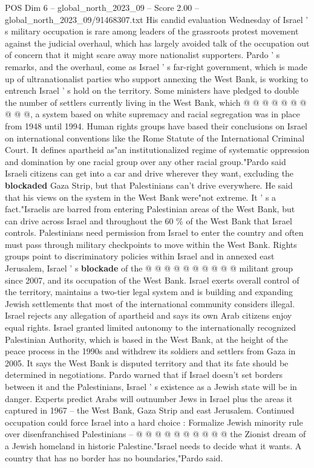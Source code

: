 \begin{textsample}{POS Dim 6 – global\_north\_2023\_09 – Score 2.00 – global\_north\_2023\_09/91468307.txt}
His candid evaluation Wednesday of Israel ' s military occupation is rare among leaders of the grassroots protest movement against the judicial overhaul, which has largely avoided talk of the occupation out of concern that it might scare away more nationalist supporters.
Pardo ' s remarks, and the overhaul, come as Israel ' s far-right government, which is made up of ultranationalist parties who support annexing the West Bank, is working to entrench Israel ' s hold on the territory.
Some ministers have pledged to double the number of settlers currently living in the West Bank, which @ @ @ @ @ @ @ @ @ @, a system based on white supremacy and racial segregation was in place from 1948 until 1994.
Human rights groups have based their conclusions on Israel on international conventions like the Rome Statute of the International Criminal Court.
It defines apartheid as"an institutionalized regime of systematic oppression and domination by one racial group over any other racial group."Pardo said Israeli citizens can get into a car and drive wherever they want, excluding the \textbf{blockaded} Gaza Strip, but that Palestinians can't drive everywhere.
He said that his views on the system in the West Bank were"not extreme.
It ' s a fact."Israelis are barred from entering Palestinian areas of the West Bank, but can drive across Israel and throughout the 60 \% of the West Bank that Israel controls.
Palestinians need permission from Israel to enter the country and often must pass through military checkpoints to move within the West Bank.
Rights groups point to discriminatory policies within Israel and in annexed east Jerusalem, Israel ' s \textbf{blockade} of the @ @ @ @ @ @ @ @ @ @ militant group since 2007, and its occupation of the West Bank.
Israel exerts overall control of the territory, maintains a two-tier legal system and is building and expanding Jewish settlements that most of the international community considers illegal.
Israel rejects any allegation of apartheid and says its own Arab citizens enjoy equal rights.
Israel granted limited autonomy to the internationally recognized Palestinian Authority, which is based in the West Bank, at the height of the peace process in the 1990s and withdrew its soldiers and settlers from Gaza in 2005.
It says the West Bank is disputed territory and that its fate should be determined in negotiations.
Pardo warned that if Israel doesn't set borders between it and the Palestinians, Israel ' s existence as a Jewish state will be in danger.
Experts predict Arabs will outnumber Jews in Israel plus the areas it captured in 1967 -- the West Bank, Gaza Strip and east Jerusalem.
Continued occupation could force Israel into a hard choice : Formalize Jewish minority rule over disenfranchised Palestinians -- @ @ @ @ @ @ @ @ @ @ the Zionist dream of a Jewish homeland in historic Palestine."Israel needs to decide what it wants.
A country that has no border has no boundaries,"Pardo said.

\end{textsample}
